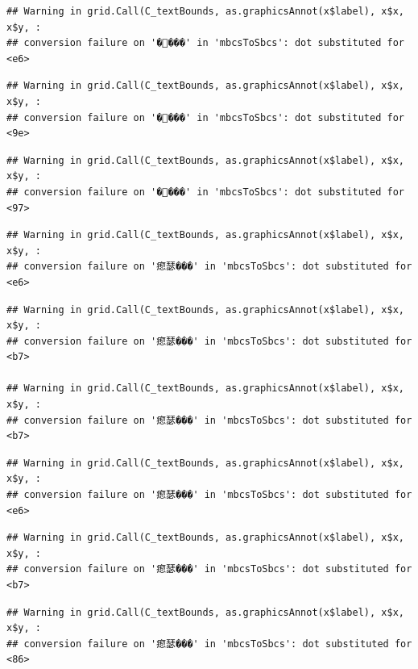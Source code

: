 \documentclass[
]{article}
\begin{document}
\begin{verbatim}
## Warning in grid.Call(C_textBounds, as.graphicsAnnot(x$label), x$x, x$y, :
## conversion failure on '����' in 'mbcsToSbcs': dot substituted for <e6>
\end{verbatim}

\begin{verbatim}
## Warning in grid.Call(C_textBounds, as.graphicsAnnot(x$label), x$x, x$y, :
## conversion failure on '����' in 'mbcsToSbcs': dot substituted for <9e>
\end{verbatim}

\begin{verbatim}
## Warning in grid.Call(C_textBounds, as.graphicsAnnot(x$label), x$x, x$y, :
## conversion failure on '����' in 'mbcsToSbcs': dot substituted for <97>
\end{verbatim}

\begin{verbatim}
## Warning in grid.Call(C_textBounds, as.graphicsAnnot(x$label), x$x, x$y, :
## conversion failure on '瘛瑟���' in 'mbcsToSbcs': dot substituted for <e6>
\end{verbatim}

\begin{verbatim}
## Warning in grid.Call(C_textBounds, as.graphicsAnnot(x$label), x$x, x$y, :
## conversion failure on '瘛瑟���' in 'mbcsToSbcs': dot substituted for <b7>

## Warning in grid.Call(C_textBounds, as.graphicsAnnot(x$label), x$x, x$y, :
## conversion failure on '瘛瑟���' in 'mbcsToSbcs': dot substituted for <b7>
\end{verbatim}

\begin{verbatim}
## Warning in grid.Call(C_textBounds, as.graphicsAnnot(x$label), x$x, x$y, :
## conversion failure on '瘛瑟���' in 'mbcsToSbcs': dot substituted for <e6>
\end{verbatim}

\begin{verbatim}
## Warning in grid.Call(C_textBounds, as.graphicsAnnot(x$label), x$x, x$y, :
## conversion failure on '瘛瑟���' in 'mbcsToSbcs': dot substituted for <b7>
\end{verbatim}

\begin{verbatim}
## Warning in grid.Call(C_textBounds, as.graphicsAnnot(x$label), x$x, x$y, :
## conversion failure on '瘛瑟���' in 'mbcsToSbcs': dot substituted for <86>
\end{verbatim}
\end{document}
